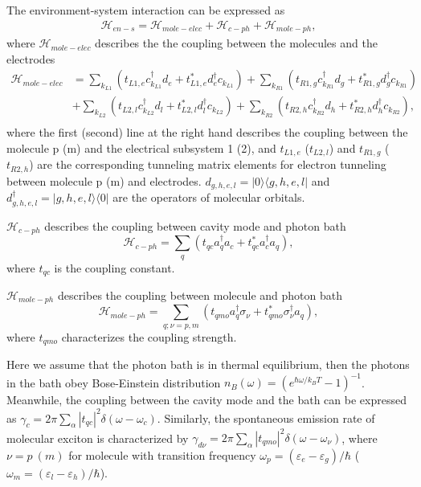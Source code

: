 \documentclass[aps,prb,
superscriptaddress,
,floatfix,footinbib,longbibliography,
preprint
]{revtex4-2}
\begin{document}
{The environment-system interaction can be expressed as
\begin{equation}
\begin{split}
\mathcal{H}_{en-s}=\mathcal{H}_{mole-elec}+\mathcal{H}_{c-ph}+\mathcal{H}_{mole-ph},
\end{split}
\end{equation}
where $\mathcal{H}_{mole-elec}$ describes the the coupling between the molecules and the electrodes
\begin{equation}
\begin{split}
\mathcal{H}_{mole-elec}&=\sum_{k_{L1}}(t_{L1,e}c_{k_{L1}}^{\dagger}d_{e}+t_{L1,e}^{\ast}d_{e}^{\dagger}c_{k_{L1}})+\sum_{k_{R1}}(t_{R1,g}c_{k_{R1}}^{\dagger}d_{g}+t_{R1,g}^{\ast}d_{g}^{\dagger}c_{k_{R1}})\\
&+\sum_{k_{L2}}(t_{L2,l}c_{k_{L2}}^{\dagger}d_{l}+t_{L2,l}^{\ast}d_{l}^{\dagger}c_{k_{L2}})+\sum_{k_{R2}}(t_{R2,h}c_{k_{R2}}^{\dagger}d_{h}+t_{R2,h}^{\ast}d_{h}^{\dagger}c_{k_{R2}}),\\
\end{split}
\label{molecule-electrode}
\end{equation}
where the first (second) line at the right hand describes the coupling between the molecule p (m) and the electrical subsystem 1 (2), and $t_{L1,e}$ ($t_{L2,l}$) and $t_{R1,g}$ ($t_{R2,h}$) are the corresponding tunneling matrix elements for electron tunneling between molecule p (m) and electrodes. $d_{g,h,e,l}=|0\rangle\langle g,h,e,l|$ and $d_{g,h,e,l}^{\dagger}=|g,h,e,l\rangle\langle 0|$ are the operators of molecular orbitals.

$\mathcal{H}_{c-ph}$ describes the coupling between cavity mode and photon bath
\begin{equation}
\mathcal{H}_{c-ph}=\sum_{q}(t_{qc}a_{q}^{\dagger}a_{c}+t_{qc}^{\ast}a_{c}^{\dagger}a_{q}),
\end{equation}
where $t_{qc}$ is the coupling constant. 

$\mathcal{H}_{mole-ph}$ describes the coupling between molecule and photon bath
\begin{equation}
\mathcal{H}_{mole-ph}=\sum_{q;\nu=p,m}(t_{qmo}a_{q}^{\dagger}\sigma_{\nu}+t_{qmo}^{\ast}\sigma_{\nu}^{\dagger}a_{q}),
\end{equation}
where $t_{qmo}$ characterizes the coupling strength.

Here we assume that the photon bath is in thermal equilibrium, then the photons in the bath obey Bose-Einstein distribution $n_{B}(\omega)=(e^{\hbar\omega/k_{B}T}-1)^{-1}$.
Meanwhile, the coupling between the cavity mode and the bath can be expressed as $\gamma_{c}=2\pi\sum_{\alpha}\left| t_{qc }\right|^{2}\delta(\omega-\omega_{c})$.
Similarly, the spontaneous emission rate of molecular exciton is characterized by $\gamma_{d\nu}=2\pi\sum_{\alpha}\left| t_{qmo }\right|^{2}\delta(\omega-\omega_{\nu})$, where $\nu=p~(m)$ for molecule with transition frequency $\omega_{p}=(\varepsilon_{e}-\varepsilon_{g})/\hbar$ ($\omega_{m}=(\varepsilon_{l}-\varepsilon_{h})/\hbar$). 

}
\end{document}
